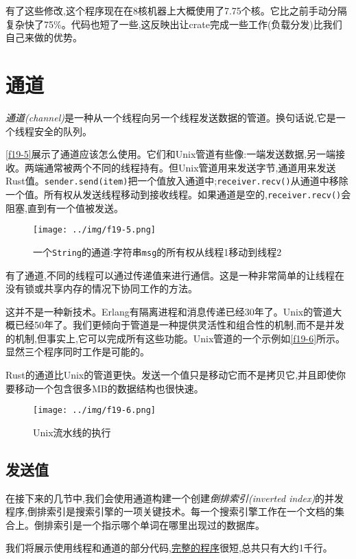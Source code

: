 有了这些修改,这个程序现在在8核机器上大概使用了7.75个核。它比之前手动分隔复杂快了75\%。代码也短了一些,这反映出让crate完成一些工作(负载分发)比我们自己来做的优势。

\section{通道}
\emph{通道(channel)}是一种从一个线程向另一个线程发送数据的管道。换句话说,它是一个线程安全的队列。

\autoref{f19-5}展示了通道应该怎么使用。它们和Unix管道有些像:一端发送数据,另一端接收。两端通常被两个不同的线程持有。但Unix管道用来发送字节,通道用来发送Rust值。\texttt{sender.send(item)}把一个值放入通道中;\texttt{receiver.recv()}从通道中移除一个值。所有权从发送线程移动到接收线程。如果通道是空的,\texttt{receiver.recv()}会阻塞,直到有一个值被发送。

\begin{figure}[htbp]
    \centering
    \texttt{[image: ../img/f19-5.png]}
    \caption{一个\texttt{String}的通道:字符串\texttt{msg}的所有权从线程1移动到线程2}
    \label{f19-5}
\end{figure}

有了通道,不同的线程可以通过传递值来进行通信。这是一种非常简单的让线程在没有锁或共享内存的情况下协同工作的方法。

这并不是一种新技术。Erlang有隔离进程和消息传递已经30年了。Unix的管道大概已经50年了。我们更倾向于管道是一种提供灵活性和组合性的机制,而不是并发的机制,但事实上,它可以完成所有这些功能。Unix管道的一个示例如\autoref{f19-6}所示。显然三个程序同时工作是可能的。

Rust的通道比Unix的管道更快。发送一个值只是移动它而不是拷贝它,并且即使你要移动一个包含很多MB的数据结构也很快速。

\begin{figure}[htbp]
    \centering
    \texttt{[image: ../img/f19-6.png]}
    \caption{Unix流水线的执行}
    \label{f19-6}
\end{figure}

\subsection{发送值}
在接下来的几节中,我们会使用通道构建一个创建\emph{倒排索引(inverted index)}的并发程序,倒排索引是搜索引擎的一项关键技术。每一个搜索引擎工作在一个文档的集合上。倒排索引是一个指示哪个单词在哪里出现过的数据库。

我们将展示使用线程和通道的部分代码,\href{https://github.com/ProgrammingRust/fingertips}{完整的程序}很短,总共只有大约1千行。

